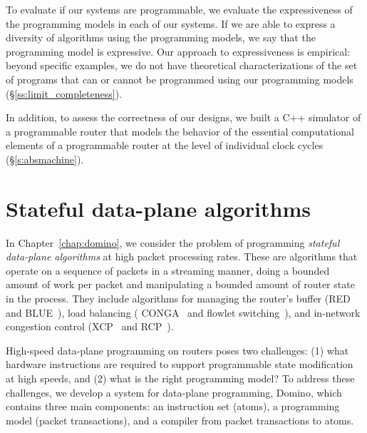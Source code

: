 To evaluate if our systems are programmable, we evaluate the expressiveness of
the programming models in each of our systems. If we are able to express a
diversity of algorithms using the programming models, we say that the
programming model is expressive. Our approach to expressiveness is empirical:
beyond specific examples, we do not have theoretical characterizations of
the set of programs that can or cannot be programmed using our programming
models (\S\ref{ss:limit_completeness}).

In addition, to assess the correctness of our designs, we built a C++ simulator
of a programmable router that models the behavior of the essential
computational elements of a programmable router at the level of individual
clock cycles (\S\ref{s:absmachine}).

\section{Stateful data-plane algorithms}
\label{s:intro_domino}

In Chapter~\ref{chap:domino}, we consider the problem of programming {\em
stateful data-plane algorithms} at high packet processing rates. These are
algorithms that operate on a sequence of packets in a streaming manner, doing
a bounded amount of work per packet and manipulating a bounded amount of router
state in the process.  They include algorithms for managing the router's buffer
(\eg RED~\cite{red} and BLUE~\cite{blue}), load balancing (\eg
CONGA~\cite{conga} and flowlet switching~\cite{flowlets}), and in-network
congestion control (\eg XCP~\cite{xcp} and RCP~\cite{rcp}).

High-speed data-plane programming on routers poses two challenges: (1) what hardware
instructions are required to support programmable state modification at high
speeds, and (2) what is the right programming model? To address these
challenges, we develop a system for data-plane programming, Domino, which
contains three main components: an instruction set (atoms), a programming model
(packet transactions), and a compiler from packet transactions to atoms.

